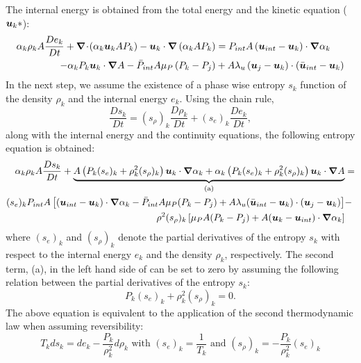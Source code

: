 The internal energy is obtained from the total energy and the kinetic equation ($\boldsymbol u_k * $):
\begin{align}\label{eq:internal1}
\alpha_k \rho_k A \frac{D e_k}{Dt} + \boldsymbol{\nabla}\! \cdot \!\left( \alpha_k \boldsymbol u_k A P_k \right) - \boldsymbol u_k \cdot \boldsymbol{\nabla} \left( \alpha_k A P_k \right) &= P_{int} A \left(\boldsymbol u_{int}-\boldsymbol u_k \right) \cdot \boldsymbol{\nabla} \alpha_k \nonumber \\
- \alpha_k P_k \boldsymbol u_k \cdot \boldsymbol{\nabla} A 
 - \bar{P}_{int} A \mu_P \left(P_k-P_j \right) &+ A \lambda_u \left(\boldsymbol u_j-\boldsymbol u_k  \right) \cdot \left(\bar{\boldsymbol u}_{int}-\boldsymbol u_k \right)
\end{align}
In the next step, we assume the existence of a phase wise entropy $s_k$ function of the density $\rho_k$ and the internal energy $e_k$. Using the chain rule,
\begin{equation}
\frac{Ds_k}{Dt} = (s_\rho)_k \frac{D \rho_k}{Dt} + (s_e)_k \frac{De_k}{Dt},
\end{equation}
along with the internal energy and the continuity equations, the following entropy equation is obtained:
\begin{eqnarray}
\label{eq:ent1}
\alpha_k \rho_k A \frac{Ds_k}{Dt} + \underbrace{A \left( P_k (s_e)_k + \rho_k^2 (s_\rho)_k \right)\boldsymbol u_k \cdot \boldsymbol{\nabla} \alpha_k + \alpha_k \left( P_k (s_e)_k + \rho_k^2 (s_\rho)_k \right) \boldsymbol u_k \cdot \boldsymbol{\nabla} A}_\textrm{(a)} &= \nonumber\\
(s_e)_k P_{int}A \left[ (\boldsymbol u_{int}-\boldsymbol u_k)\cdot \boldsymbol{\nabla} \alpha_k - \bar{P}_{int} A \mu_P (P_k-P_j) + A \lambda_u (\bar{\boldsymbol u}_{int}-\boldsymbol u_k) \cdot (\boldsymbol u_j-\boldsymbol u_k)\right] &- \nonumber\\
\rho^2 (s_\rho)_k \left[ \mu_P A (P_k-P_j) + A(\boldsymbol u_k-\boldsymbol u_{int}) \cdot \boldsymbol{\nabla} \alpha_k\right] & 
\end{eqnarray}
where $(s_e)_k$ and $(s_\rho)_k$ denote the partial derivatives of the entropy $s_k$ with respect to the internal energy $e_k$ and the density $\rho_k$, respectively.
The second term, (a), in the left hand side of  can be set to zero by assuming the following relation between the partial derivatives of the entropy $s_k$:
\begin{equation}
\label{eq:ent2}
 P_k (s_e)_k + \rho_k^2 (s_\rho)_k = 0 .
\end{equation} 
The above equation is equivalent to the application of the second thermodynamic law when assuming reversibility:
\begin{equation}
T_k ds_k = de_k - \frac{P_k}{\rho_k^2} d \rho_k \text{ with } (s_e)_k = \frac{1}{T_k} \text{ and } (s_\rho)_k = - \frac{P_k}{\rho_k^2} (s_e)_k
\end{equation}
